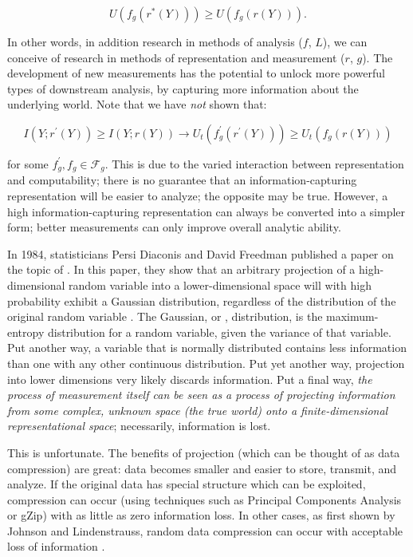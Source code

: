 \[
U(f_g(r^*(Y))) \geq U(f_g(r(Y))).
\]

In other words, in addition research in methods of analysis ($f$, $L$), we can conceive of research in methods of representation and measurement ($r$, $g$).
The development of new measurements has the potential to unlock more powerful types of downstream analysis, by capturing more information about the underlying world.
Note that we have \textit{not} shown that:

\[
I(Y; r^\prime(Y)) \geq I(Y; r(Y)) \rightarrow U_t(f_g^\prime(r^\prime(Y))) \geq U_t(f_g(r(Y)))
\]

for some $f_g^\prime, f_g \in \mathcal{F}_g$.
This is due to the varied interaction between representation and computability; there is no guarantee that an information-capturing representation will be easier to analyze; the opposite may be true.
However, a high information-capturing representation can always be converted into a simpler form; better measurements can only improve overall analytic ability.

\bigskip

In 1984, statisticians Persi Diaconis and David Freedman published a paper on the topic of .
In this paper, they show that an arbitrary projection of a high-dimensional random variable into a lower-dimensional space will with high probability exhibit a Gaussian distribution, regardless of the distribution of the original random variable \citep{diaconis}.
The Gaussian, or , distribution, is the maximum-entropy distribution for a random variable, given the variance of that variable.
Put another way, a variable that is normally distributed contains less information than one with any other continuous distribution.
Put yet another way, projection into lower dimensions very likely discards information.
Put a final way, \textit{the process of measurement itself can be seen as a process of projecting information from  some complex, unknown space (the true world) onto a finite-dimensional representational space}; necessarily, information is lost.

This is unfortunate.
The benefits of projection (which can be thought of as data compression) are great: data becomes smaller and easier to store, transmit, and analyze.
If the original data has special structure which can be exploited, compression can occur (using techniques such as Principal Components Analysis or gZip) with as little as zero information loss.
In other cases, as first shown by Johnson and Lindenstrauss, random data compression can occur with acceptable loss of information \citep{dasgupta}.

